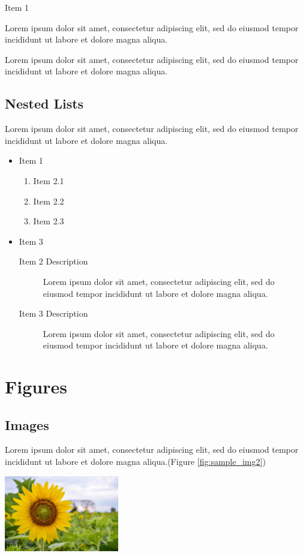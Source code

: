 \documentclass[a4paper, 12pt]{report}
\begin{document}
\begin{description}
	\item Item 1
	\item[Item 2 Description] Lorem ipsum dolor sit amet, consectetur adipiscing elit, sed do eiusmod tempor incididunt ut labore et dolore magna aliqua.
	\item[Item 3 Description] Lorem ipsum dolor sit amet, consectetur adipiscing elit, sed do eiusmod tempor incididunt ut labore et dolore magna aliqua.
\end{description}

\section{Nested Lists}
Lorem ipsum dolor sit amet, consectetur adipiscing elit, sed do eiusmod tempor incididunt ut labore et dolore magna aliqua.

\begin{itemize}
	\item Item 1
	\begin{enumerate}
		\item Item 2.1
		\item Item 2.2
		\item Item 2.3
	\end{enumerate}
	\item Item 3
	\begin{description}
		\item[Item 2 Description] Lorem ipsum dolor sit amet, consectetur adipiscing elit, sed do eiusmod tempor incididunt ut labore et dolore magna aliqua.
	\item[Item 3 Description] Lorem ipsum dolor sit amet, consectetur adipiscing elit, sed do eiusmod tempor incididunt ut labore et dolore magna aliqua.
	\end{description}
\end{itemize}



\chapter{Figures}
\section{Images}
Lorem ipsum dolor sit amet, consectetur adipiscing elit, sed do eiusmod tempor incididunt ut labore et dolore magna aliqua.(Figure \ref{fig:sample_img2})

\vspace{.5cm}
\includegraphics[width=5cm]{sample_img1}
\end{document}
